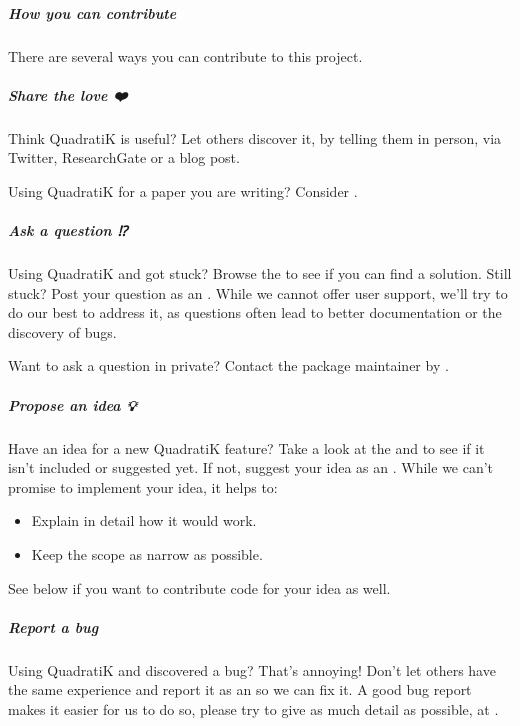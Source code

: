 \documentclass[letterpaper,10pt,english,openany,oneside]{sphinxmanual}
\begin{document}
{{{{\subparagraph{How you can contribute}
\label{\detokenize{development/CONTRIBUTING:how-you-can-contribute}}
\sphinxAtStartPar
There are several ways you can contribute to this project.


\subparagraph{Share the love ❤️}
\label{\detokenize{development/CONTRIBUTING:share-the-love}}
\sphinxAtStartPar
Think QuadratiK is useful? Let others discover it, by telling them in person, via Twitter, ResearchGate or a blog post.

\sphinxAtStartPar
Using QuadratiK for a paper you are writing? Consider .


\subparagraph{Ask a question ⁉️}
\label{\detokenize{development/CONTRIBUTING:ask-a-question}}
\sphinxAtStartPar
Using QuadratiK and got stuck? Browse the  to see if you can find a solution. Still stuck? Post your question as an . While we cannot offer user support, we’ll try to do our best to address it, as questions often lead to better documentation or the discovery of bugs.

\sphinxAtStartPar
Want to ask a question in private? Contact the package maintainer by .


\subparagraph{Propose an idea 💡}
\label{\detokenize{development/CONTRIBUTING:propose-an-idea}}
\sphinxAtStartPar
Have an idea for a new QuadratiK feature? Take a look at the  and  to see if it isn’t included or suggested yet. If not, suggest your idea as an . While we can’t promise to implement your idea, it helps to:
\begin{itemize}
\item {} 
\sphinxAtStartPar
Explain in detail how it would work.

\item {} 
\sphinxAtStartPar
Keep the scope as narrow as possible.

\end{itemize}

\sphinxAtStartPar
See below if you want to contribute code for your idea as well.


\subparagraph{Report a bug 🐛}
\label{\detokenize{development/CONTRIBUTING:report-a-bug}}
\sphinxAtStartPar
Using QuadratiK and discovered a bug? That’s annoying! Don’t let others have the same experience and report it as an  so we can fix it. A good bug report makes it easier for us to do so, please try to give as much detail as possible, at .


}}}}
\end{document}
